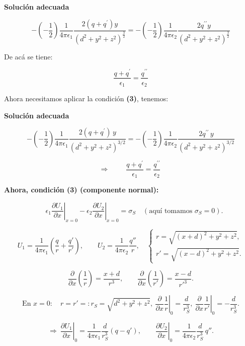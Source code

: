 \documentclass{article}
\begin{document}
\textcolor{Cinnabar}{\textbf{Solución adecuada}}

\[ - \left( -\frac{1}{2} \right) \frac{  1}{4\pi \epsilon_{1}} \frac{ 2( q+q^{\prime} )y }{( d^{2} + y^{2} + z^{2})^{\frac{3}{2}}} = - \left(  -\frac{1}{2}  \right) \frac{1 }{4\pi\epsilon_{2}} \frac{ 2 q^{{\prime}{\prime}} y}{ ( d^{2} + y^{2} + z^{2} )^{ \frac{3}{2}} }   \]


De acá se tiene:


\[  \frac{  q+q^{\prime} }{ \epsilon_{1} } = \frac{ q^{ {\prime}{\prime}} }{\epsilon_{2}}  \]


Ahora necesitamos aplicar la condición \textbf{(3)}, tenemos: 


\textcolor{Cinnabar}{\textbf{Solución adecuada}}

\[
- \left( -\frac{1}{2} \right) \frac{1}{4\pi \epsilon_{1}}
\frac{ 2( q+q^{\prime} )\,y }{( d^{2} + y^{2} + z^{2})^{3/2}}
=
- \left( -\frac{1}{2} \right) \frac{1}{4\pi\epsilon_{2}}
\frac{ 2 q^{\prime\prime}\, y}{ ( d^{2} + y^{2} + z^{2} )^{3/2} }
\]

\[
\Rightarrow\qquad
\boxed{\;\frac{  q+q^{\prime} }{ \epsilon_{1} } = \frac{ q^{ \prime\prime } }{\epsilon_{2}}\;}
\]

\textbf{Ahora, condición (3) (componente normal):}

\[\quad
\epsilon_1 \left.\frac{\partial U_1}{\partial x}\right|_{x=0}
- \epsilon_2 \left.\frac{\partial U_2}{\partial x}\right|_{x=0}
= \sigma_S \quad (\text{aquí tomamos } \sigma_S=0).
\]

\[
U_1=\frac{1}{4\pi\epsilon_1}\!\left(\frac{q}{r}+\frac{q'}{r'}\right),
\qquad
U_2=\frac{1}{4\pi\epsilon_2}\frac{q''}{r},
\quad
\begin{cases}
r=\sqrt{(x+d)^2+y^2+z^2},\\
r'=\sqrt{(x-d)^2+y^2+z^2}.
\end{cases}
\]

\[
\frac{\partial}{\partial x}\!\left(\frac{1}{r}\right)=\frac{x+d}{r^3},
\qquad
\frac{\partial}{\partial x}\!\left(\frac{1}{r'}\right)=\frac{x-d}{r'^3}.
\]

\[
\text{En }x=0:\quad r=r'=:r_S=\sqrt{d^2+y^2+z^2},\ 
\left.\frac{\partial}{\partial x}\!\frac{1}{r}\right|_{0}=\frac{d}{r_S^3},\ 
\left.\frac{\partial}{\partial x}\!\frac{1}{r'}\right|_{0}=-\frac{d}{r_S^3}.
\]

\[
\Rightarrow\ 
\left.\frac{\partial U_1}{\partial x}\right|_{0}
=\frac{1}{4\pi\epsilon_1}\frac{d}{r_S^3}(q-q'),
\qquad
\left.\frac{\partial U_2}{\partial x}\right|_{0}
=\frac{1}{4\pi\epsilon_2}\frac{d}{r_S^3}\,q''.
\]
\end{document}
